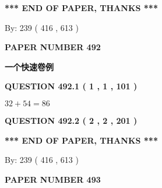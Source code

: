 \documentclass{ctexart}
\begin{document}
   
   
\vspace{1.0in} 
{\textbf{\large{ *** END OF PAPER, THANKS *** }}} 
   
   
\hspace{1.0in} By: 
 239 ( 416 ,  613 )
   
   
   
   
\newpage 
\setcounter{page}{ 
   492001 } 
   
   
   
   
 {\textbf{ \Large{ PAPER NUMBER  492  }}}
   
   
\vspace{0.2in}
   
   
   
   
   
   
 \vspace{0.2in}
{\LARGE {\textbf{ 一个快速卷例}}}
   
   
  
\vspace{0.2in}
  
{\textbf{\Large{QUESTION
492.1 
 ( 1 , 1 , 101 )
}}}
  
  
 
 

$ %
32 +  %
54=   %
86$
 
 
  
\vspace{0.2in}
  
{\textbf{\Large{QUESTION
492.2 
 ( 2 , 2 , 201 )
}}}
  
  
   
   
 \vspace{0.2in}
 
   
   
   
   
\vspace{1.0in} 
{\textbf{\large{ *** END OF PAPER, THANKS *** }}} 
   
   
\hspace{1.0in} By: 
 239 ( 416 ,  613 )
   
   
   
   
\newpage 
\setcounter{page}{ 
   493001 } 
   
   
   
   
 {\textbf{ \Large{ PAPER NUMBER  493  }}}
   
   
\vspace{0.2in}
   
\end{document}

